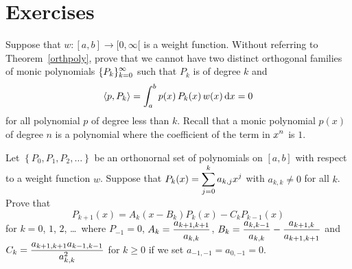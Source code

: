 \section{Exercises}

\begin{question}
Suppose that $w:[a,b] \rightarrow [0,\infty[$ is a weight function.
Without referring to Theorem~\ref{orthpoly}, prove that we cannot have
two distinct orthogonal families of monic polynomials
$\displaystyle \{ P_k \}_{k=0}^\infty$ such that $P_k$ is of degree $k$ and
\[
  \left\langle{p} , {P_k}\right\rangle = \int_a^b p(x)\,P_k(x) \,w(x)\,\mathrm{d}x = 0
\]
for all polynomial $p$ of degree less than $k$.  Recall that a monic
polynomial $p(x)$ of degree $n$ is a polynomial where the coefficient
of the term in $\displaystyle x^n$ is $1$.
\end{question}


\begin{question}
Let $\left\{ P_0,P_1,P_2,\ldots \right\}$ be an orthonornal set of
polynomials on $[a,b]$ with respect to a weight function $w$.
Suppose that $\displaystyle P_k(x) = \sum_{j=0}^k a_{k,j}x^j$ with
$a_{k,k} \neq 0$ for all $k$.
Prove that
\begin{equation} \label{apprAQ2equ1}
P_{k+1}(x) = A_k(x-B_k)P_k(x) - C_k P_{k-1}(x)
\end{equation}
for $k=0$, $1$, $2$, \ldots\ where $P_{-1} = 0$,
$\displaystyle A_k = \frac{a_{k+1,k+1}}{a_{k,k}}$,
$\displaystyle B_k = \frac{a_{k,k-1}}{a_{k,k}}- \frac{a_{k+1,k}}{a_{k+1,k+1}} $
and
$\displaystyle C_k = \frac{a_{k+1,k+1}a_{k-1,k-1}}{a_{k,k}^2}$
for $k\geq 0$ if we set $a_{-1,-1} = a_{0,-1} = 0$.
\label{apprAQ2}
\end{question}

